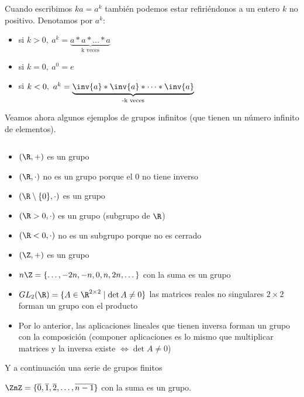 Cuando escribimos $ka = a^k$ también podemos estar refiriéndonos a un entero $k$ no positivo. Denotamos por $a^k$:
\begin{itemize}
	\item si $k > 0,\ a^k = \underbrace{a \ast a \ast \dots \ast a}_\text{k veces}$
	\item si $k = 0,\ a^0 = e$
	\item si $k < 0,\ a^k = \underbrace{\inv{a} \ast \inv{a} \ast \dots \ast \inv{a}}_\text{-k veces}$
\end{itemize}

Veamos ahora algunos ejemplos de grupos infinitos (que tienen un número infinito de elementos).

\begin{ej}$ $\newline
	\begin{itemize}
		\item $(\R, +)$ es un grupo
		\item $(\R, \cdot)$ no es un grupo porque el $0$ no tiene inverso
		\item $(\R\setminus\{0\}, \cdot)$ es un grupo
		\item $(\R > 0, \cdot)$ es un grupo (subgrupo de $\R$)
		\item $(\R < 0, \cdot)$ no es un subgrupo porque no es cerrado
		\item $(\Z, +)$ es un grupo
		\item $n\Z = \{\dots, -2n, -n, 0, n, 2n, \dots\}$ con la suma es un grupo
		\item $GL_2(\R) = \{A \in \R^{2\times 2} \mid \det A \neq 0\}$ las matrices reales no singulares $2\times 2$ forman un grupo con el producto
		\item Por lo anterior, las aplicaciones lineales que tienen inversa forman un grupo con la composición (componer aplicaciones es lo mismo que multiplicar matrices y la inversa existe $\iff \det A \neq 0$)
	\end{itemize}
\end{ej}

Y a continuación una serie de grupos finitos

\begin{ej}
	$\ZnZ = \{\overline{0}, \overline{1}, \overline{2}, \dots, \overline{n-1}\}$ con la suma es un grupo.
\end{ej}

